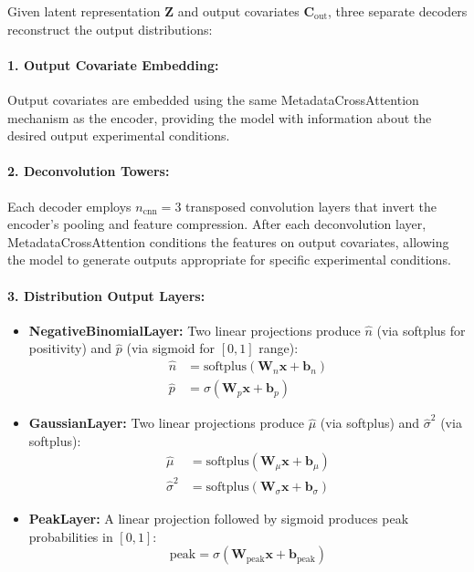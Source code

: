 Given latent representation $\mathbf{Z}$ and output covariates $\mathbf{C}_{\text{out}}$, three separate decoders reconstruct the output distributions:

\paragraph{1. Output Covariate Embedding:} 
Output covariates are embedded using the same MetadataCrossAttention mechanism as the encoder, providing the model with information about the desired output experimental conditions.

\paragraph{2. Deconvolution Towers:} 
Each decoder employs $n_{\text{cnn}} = 3$ transposed convolution layers that invert the encoder's pooling and feature compression. After each deconvolution layer, MetadataCrossAttention conditions the features on output covariates, allowing the model to generate outputs appropriate for specific experimental conditions.

\paragraph{3. Distribution Output Layers:}
\begin{itemize}
    \item \textbf{NegativeBinomialLayer:} Two linear projections produce $\hat{n}$ (via softplus for positivity) and $\hat{p}$ (via sigmoid for $[0,1]$ range):
    \begin{align}
        \hat{n} &= \text{softplus}(\mathbf{W}_n \mathbf{x} + \mathbf{b}_n) \\
        \hat{p} &= \sigma(\mathbf{W}_p \mathbf{x} + \mathbf{b}_p)
    \end{align}
    
    \item \textbf{GaussianLayer:} Two linear projections produce $\hat{\mu}$ (via softplus) and $\hat{\sigma}^2$ (via softplus):
    \begin{align}
        \hat{\mu} &= \text{softplus}(\mathbf{W}_\mu \mathbf{x} + \mathbf{b}_\mu) \\
        \hat{\sigma}^2 &= \text{softplus}(\mathbf{W}_\sigma \mathbf{x} + \mathbf{b}_\sigma)
    \end{align}
    
    \item \textbf{PeakLayer:} A linear projection followed by sigmoid produces peak probabilities in $[0,1]$:
    \begin{equation}
        \text{peak} = \sigma(\mathbf{W}_{\text{peak}} \mathbf{x} + \mathbf{b}_{\text{peak}})
    \end{equation}
\end{itemize}


